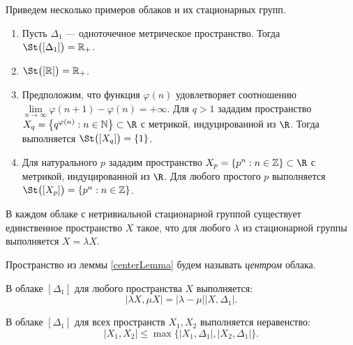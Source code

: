 \begin{example}
  Приведем несколько примеров облаков и их стационарных групп.
  \begin{enumerate}
    \item Пусть $\Delta_1$ --- одноточечное метрическое
      пространство.  Тогда\\ $\St\bigl([\Delta_1]\bigr) = \mathbb{R}_+$.
    \item $\St\bigl([\mathbb{R}]\bigr) = \mathbb{R}_+ $.
    \item Предположим, что функция $\varphi(n)$ удовлетворяет соотношению
      $\lim\limits_{n \rightarrow \infty } \varphi(n + 1) - \varphi(n) =
      +\infty$. Для $q > 1$ зададим пространство $X_q =
      \left\{q^{\varphi(n)}: n \in \mathbb{N}\right\} \subset \R$ с метрикой,
      индуцированной из \( \R \).
      Тогда выполняется
      $\St\bigl(\left[X_q\right]\bigr) = \{1\}$\cite{TuzhBog1}.
    \item Для натурального $p$ зададим пространство $X_p = \left\{p^n:n
      \in \mathbb{Z}\right\} \subset \R$ с метрикой, индуцированной из \( \R \).
      Для любого простого $p$ выполняется $\St\bigl(\left[X_p\right]\bigr) =
      \left\{p^n:n \in \mathbb{Z}\right\}$\cite{BogBog1}.
  \end{enumerate}
\end{example}
\begin{lemma}
  В каждом облаке с нетривиальной стационарной группой существует единственное
  пространство $X$ такое, что для любого $\lambda$ из стационарной группы
  выполняется $X = \lambda X$.
  \label{centerLemma}
\end{lemma}
\begin{definition}
  Пространство из леммы \ref{centerLemma} будем называть \emph{центром} облака.
\end{definition}
\begin{remark} В
  облаке $[\Delta_1]$ для любого пространства $X$ выполняется:
  $$|\lambda X, \mu X| = |\lambda - \mu||X,\Delta_1|.$$
\end{remark}
\begin{remark} В облаке
  $[\Delta_{1}]$ для всех пространств $X_{1}, X_{2}$ выполняется неравенство:
  \[
    |X_{1},X_{2}| \le \max\big\{|X_{1}, \Delta_{1}|,|X_{2},\Delta_{1}|\big\}.
  \]
  \label{remUltraMetric}
\end{remark}
